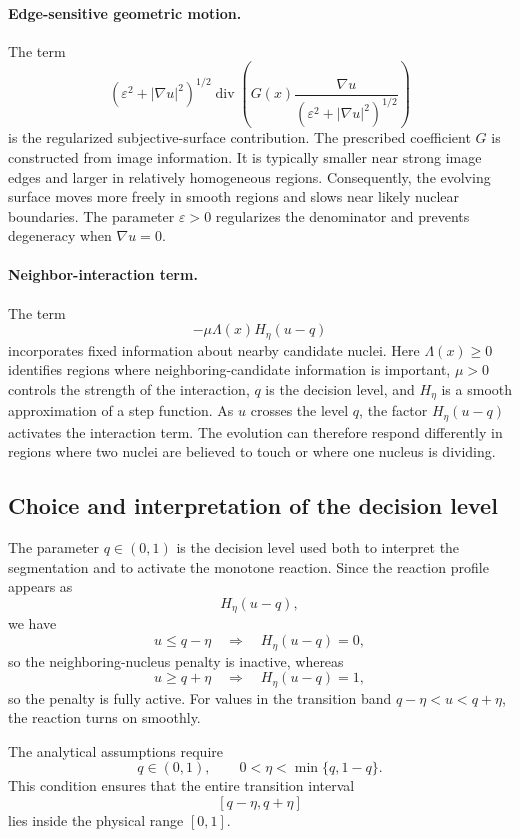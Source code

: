 \documentclass[11pt]{article}
\theoremstyle{remark}
\newcommand{\eps}{\varepsilon}
\begin{document}
\paragraph{Edge-sensitive geometric motion.}
The term
\[
\left(\eps^2+|\nabla u|^2\right)^{1/2}
\operatorname{div}\!\left(
G(x)\frac{\nabla u}{\left(\eps^2+|\nabla u|^2\right)^{1/2}}
\right)
\]
is the regularized subjective-surface contribution.  The prescribed coefficient $G$ is constructed from image information.  It is typically smaller near strong image edges and larger in relatively homogeneous regions.  Consequently, the evolving surface moves more freely in smooth regions and slows near likely nuclear boundaries.  The parameter $\eps>0$ regularizes the denominator and prevents degeneracy when $\nabla u=0$.

\paragraph{Neighbor-interaction term.}
The term
\[
-\mu\Lambda(x)H_\eta(u-q)
\]
incorporates fixed information about nearby candidate nuclei.  Here $\Lambda(x)\ge0$ identifies regions where neighboring-candidate information is important, $\mu>0$ controls the strength of the interaction, $q$ is the decision level, and $H_\eta$ is a smooth approximation of a step function.  As $u$ crosses the level $q$, the factor $H_\eta(u-q)$ activates the interaction term.  The evolution can therefore respond differently in regions where two nuclei are believed to touch or where one nucleus is dividing.

\subsection{Choice and interpretation of the decision level}

The parameter $q\in(0,1)$ is the decision level used both to interpret the segmentation and to activate the monotone reaction.  Since the reaction profile appears as
\[
H_\eta(u-q),
\]
we have
\[
u\le q-\eta
\quad\Longrightarrow\quad
H_\eta(u-q)=0,
\]
so the neighboring-nucleus penalty is inactive, whereas
\[
 u\ge q+\eta
\quad\Longrightarrow\quad
H_\eta(u-q)=1,
\]
so the penalty is fully active.  For values in the transition band $q-\eta<u<q+\eta$, the reaction turns on smoothly.

The analytical assumptions require
\[
q\in(0,1),
\qquad
0<\eta<\min\{q,1-q\}.
\]
This condition ensures that the entire transition interval
\[
[q-\eta,q+\eta]
\]
lies inside the physical range $[0,1]$.
\end{document}
